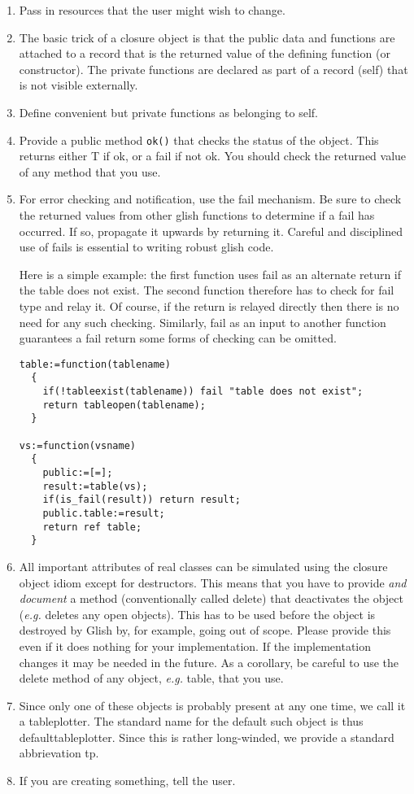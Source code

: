 \begin{enumerate}
\item Pass in resources that the user might wish to change.
\item The basic trick of a closure object is that the 
public data and functions are attached to a record that is the returned value
of the defining function (or constructor). The private functions are
declared as part of a record (self) that is not visible externally.
\item Define convenient but private functions as belonging to self.
\item Provide a public method \texttt{ok()} that checks the
status of the object. This returns either T if ok, or a fail
if not ok. You should check the returned value of any method
that you use.
\item For error checking and notification, use the fail mechanism.
Be sure to check the returned values from other glish functions to
determine if a fail has occurred. If so, propagate it upwards
by returning it. Careful and disciplined use of fails is
essential to writing robust glish code.

Here is a simple example: the first function uses fail as an
alternate return if the table does not exist. The second
function therefore has to check for fail type and relay it.
Of course, if the return is relayed directly then there is no
need for any such checking. Similarly, fail as an input to
another function guarantees a fail return some forms
of checking can be omitted.

\begin{verbatim}
table:=function(tablename)
  {
    if(!tableexist(tablename)) fail "table does not exist";
    return tableopen(tablename);
  }

vs:=function(vsname)
  {
    public:=[=];
    result:=table(vs);
    if(is_fail(result)) return result;
    public.table:=result;
    return ref table;
  }
\end{verbatim}

\item All important attributes of real classes can be simulated using
the closure object idiom except for destructors. This means that you
have to provide {\em and document} a method (conventionally called
delete) that deactivates the object ({\em e.g.} deletes any open
objects). This has to be used before the object is destroyed by Glish
by, for example, going out of scope. Please provide this even if it
does nothing for your implementation. If the implementation changes it
may be needed in the future. As a corollary, be careful to use the
delete method of any object, {\em e.g.} table, that you use.
\item Since only one of these objects is probably present at
any one time, we call it a tableplotter. The standard name for the
default such object is thus defaulttableplotter. Since this is
rather long-winded, we provide a standard abbrievation tp.
\item If you are creating something, tell the user.
\end{enumerate}

